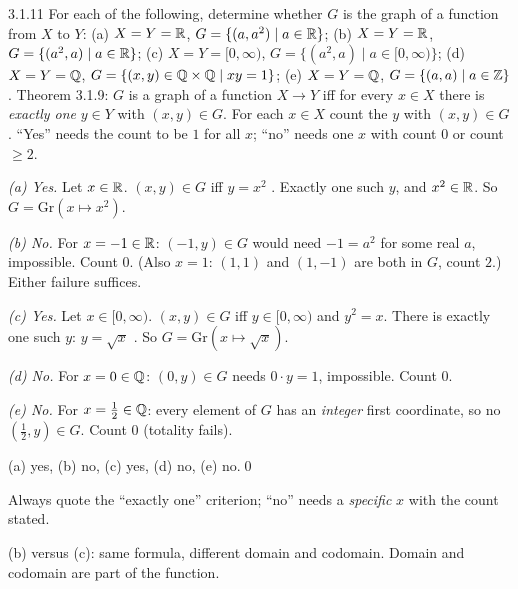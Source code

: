 \begin{bookex}[essential]{3.1.11}
For each of the following, determine whether $G$ is the graph of a function from $X$ to $Y$: (a) $X=Y=\mathbb{R}$, $G=\{(a,a^2)\mid a\in\mathbb{R}\}$; (b) $X=Y=\mathbb{R}$, $G=\{(a^2,a)\mid a\in\mathbb{R}\}$; (c) $X=Y=[0,\infty)$, $G=\{(a^2,a)\mid a\in[0,\infty)\}$; (d) $X=Y=\mathbb{Q}$, $G=\{(x,y)\in\mathbb{Q}\times\mathbb{Q}\mid xy=1\}$; (e) $X=Y=\mathbb{Q}$, $G=\{(a,a)\mid a\in\mathbb{Z}\}$.
\solution
\given Theorem 3.1.9: $G$ is a graph of a function $X\to Y$ iff for every $x\in X$ there is \emph{exactly one} $y\in Y$ with $(x,y)\in G$.
\plan For each $x\in X$ count the $y$ with $(x,y)\in G$. ``Yes'' needs the count to be $1$ for all $x$; ``no'' needs one $x$ with count $0$ or count $\ge2$.
\begin{steps}
\item \emph{(a) Yes.} Let $x\in\mathbb{R}$. $(x,y)\in G$ iff $y=x^2$ . Exactly one such $y$, and $x^2\in\mathbb{R}$. So $G=\mathrm{Gr}(x\mapsto x^2)$.
\item \emph{(b) No.} For $x=-1\in\mathbb{R}$: $(-1,y)\in G$ would need $-1=a^2$ for some real $a$, impossible. Count $0$. (Also $x=1$: $(1,1)$ and $(1,-1)$ are both in $G$, count $2$.) Either failure suffices.
\item \emph{(c) Yes.} Let $x\in[0,\infty)$. $(x,y)\in G$ iff $y\in[0,\infty)$ and $y^2=x$. There is exactly one such $y$: $y=\sqrt x$ . So $G=\mathrm{Gr}(x\mapsto\sqrt x)$.
\item \emph{(d) No.} For $x=0\in\mathbb{Q}$: $(0,y)\in G$ needs $0\cdot y=1$, impossible. Count $0$.
\item \emph{(e) No.} For $x=\frac12\in\mathbb{Q}$: every element of $G$ has an \emph{integer} first coordinate, so no $(\frac12,y)\in G$. Count $0$ (totality fails).
\end{steps}
\conclusion (a) yes, (b) no, (c) yes, (d) no, (e) no.\qed
\begin{compare}
\item Always quote the ``exactly one'' criterion; ``no'' needs a \emph{specific} $x$ with the count stated.
\item (b) versus (c): same formula, different domain and codomain. Domain and codomain are part of the function.
\end{compare}
\end{bookex}

